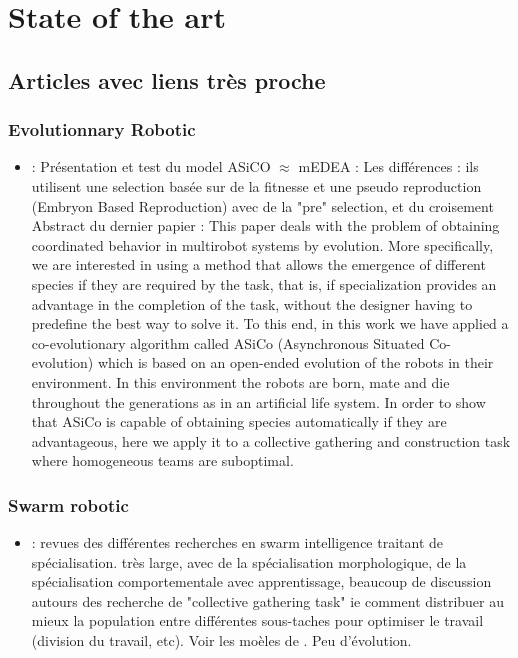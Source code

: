 \documentclass[a4paper,10pt]{article}
\begin{document}
\section{State of the art}
% 
\subsection{Articles avec liens très proche}
\subsubsection{Evolutionnary Robotic}
\begin{itemize}
\item \cite{prieto10openevolasmeantoselfhetemultsystrealtime,trueba2011task}: Présentation et test du model ASiCO $\approx$ mEDEA : Les différences : ils utilisent une selection basée sur de la fitnesse et une pseudo reproduction (Embryon Based Reproduction) avec de la "pre" selection, et du croisement \\
Abstract du dernier papier : This paper deals with the problem of obtaining coordinated behavior in multirobot systems by evolution. More specifically, we are interested in using a method that allows the emergence of different species if they are required by the task, that is, if specialization provides an advantage in the completion of the task, without the designer having to predefine the best way to solve it. To this end, in this work we have applied a co-evolutionary algorithm called ASiCo (Asynchronous Situated Co-evolution) which is based on an open-ended evolution of the robots in their environment. In this environment the robots are born, mate and die throughout the generations as in an artificial life system. In order to show that ASiCo is capable of obtaining species automatically if they are advantageous, here we apply it to a collective gathering and construction task where homogeneous teams are suboptimal.
\end{itemize}

\subsubsection{Swarm robotic}
\begin{itemize}
 \item \cite{nitschke08emergentspecializationbiologicallyinspiredcollectivebehaviorsystems} : revues des différentes recherches en swarm intelligence traitant de spécialisation. très large, avec de la spécialisation morphologique, de la spécialisation comportementale avec apprentissage, beaucoup de discussion autours des recherche de "collective gathering task" ie comment distribuer au mieux la population entre différentes sous-taches pour optimiser le travail (division du travail, etc). Voir les moèles de \cite{bonabeau96quantitativestudyfixedthresholdmodelregulationdivisionlabourinsectsocieties,bonabeau97adaptivetaskallocationinspiredbymodeldivisionlaborsocialinsects}. Peu d'évolution.
\end{itemize}
\end{document}
